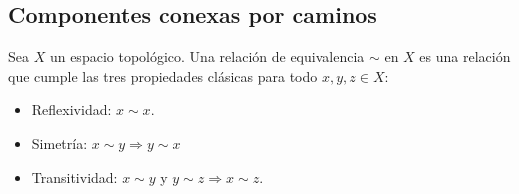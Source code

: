 \subsection{Componentes conexas por caminos}
\begin{definición}
    Sea $X$ un espacio topológico. Una relación de equivalencia $\sim$ en $X$ es una relación que cumple las tres propiedades clásicas para todo $x, y, z \in X$:
    \begin{itemize}
        \item Reflexividad: $x \sim x$.
        \item Simetría: $x \sim y \Rightarrow y \sim x$
        \item Transitividad: $x \sim y$ y $y \sim z \Rightarrow x \sim z$.
    \end{itemize}
\end{definición}

